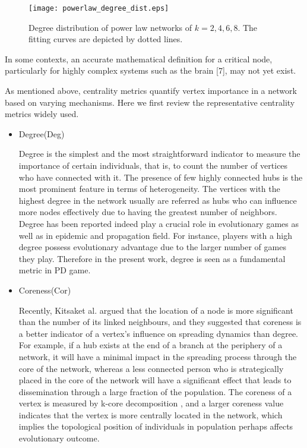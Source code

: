 \documentclass[preprint,12pt,3p]{elsarticle}
\begin{document}
\begin{figure}
  \centering
  \texttt{[image: powerlaw\_degree\_dist.eps]}
  \caption{Degree distribution of power law networks of $k=2,4,6,8$.
  The fitting curves are depicted by dotted lines.}
  \label{fig_degree}
\end{figure}


\label{centrality,option, corr}
In some contexts, an accurate mathematical
definition for a critical node, particularly for highly complex systems such as the
brain [7], may not yet exist.

As mentioned above, centrality metrics quantify vertex importance in a network based on varying mechanisms.
Here we first review the representative centrality metrics widely used.
\begin{itemize}

\item Degree(Deg)

Degree is the simplest and the most straightforward indicator to measure the importance
of certain individuals, that is, to count the number of vertices who have connected with it.
The presence of few highly connected hubs is the most prominent feature in terms of heterogeneity.
The vertices with the highest degree in the network usually are referred as hubs who
can influence more nodes effectively due to having the greatest number of neighbors.
Degree has been reported indeed play a crucial role in evolutionary games as well as in epidemic and propagation field.
For instance, players with a high degree possess evolutionary advantage due to the larger
number of games they play.
Therefore in the present work, degree is seen as a fundamental metric in PD game.

\item Coreness(Cor)

Recently, Kitsaket al. \cite{KitsakGallos-17826} argued that the location of a node is
more significant than the number of its linked neighbours, and
they suggested that coreness is a better indicator of a vertex’s
influence on spreading dynamics than degree.
For example, if a hub exists at the end of a branch
at the periphery of a network, it will have a minimal impact
in the spreading process through the core of the network,
whereas a less connected person who is strategically placed in
the core of the network will have a significant effect that leads
to dissemination through a large fraction of the population.
The coreness of a vertex is measured by k-core decomposition \cite{DorogovtsevGoltsev-18309} ,
and a larger coreness value indicates that the vertex is more centrally located in
the network, which implies the topological position of individuals in population perhaps affects evolutionary outcome.


\end{itemize}
\end{document}

